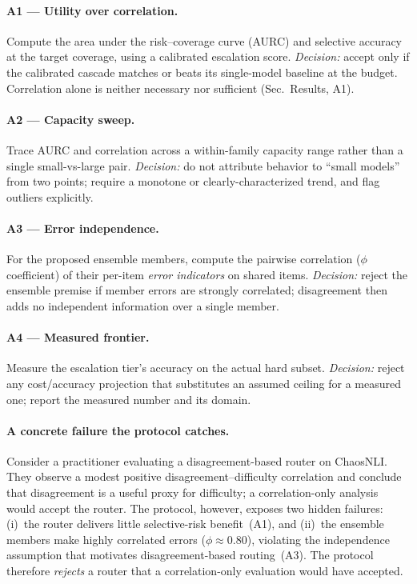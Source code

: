 \documentclass[letterpaper]{article} %
\begin{document}
\paragraph{A1 --- Utility over correlation.}
Compute the area under the risk--coverage curve (AURC) and selective accuracy at
the target coverage, using a calibrated escalation score. \emph{Decision:} accept
only if the calibrated cascade matches or beats its single-model baseline at the
budget. Correlation alone is neither necessary nor sufficient (Sec.~Results, A1).

\paragraph{A2 --- Capacity sweep.}
Trace AURC and correlation across a within-family capacity range rather than a
single small-vs-large pair. \emph{Decision:} do not attribute behavior to ``small
models'' from two points; require a monotone or clearly-characterized trend, and
flag outliers explicitly.

\paragraph{A3 --- Error independence.}
For the proposed ensemble members, compute the pairwise correlation
($\phi$ coefficient) of their per-item \emph{error indicators} on shared items.
\emph{Decision:} reject the ensemble premise if member errors are strongly
correlated; disagreement then adds no independent information over a single member.

\paragraph{A4 --- Measured frontier.}
Measure the escalation tier's accuracy on the actual hard subset. \emph{Decision:}
reject any cost/accuracy projection that substitutes an assumed ceiling for a
measured one; report the measured number and its domain.

\paragraph{A concrete failure the protocol catches.}
Consider a practitioner evaluating a disagreement-based router on ChaosNLI.
They observe a modest positive disagreement--difficulty correlation and conclude
that disagreement is a useful proxy for difficulty; a correlation-only analysis
would accept the router. The protocol, however, exposes two hidden failures:
(i)~the router delivers little selective-risk benefit~(A1), and (ii)~the ensemble
members make highly correlated errors ($\phi \approx 0.80$), violating the
independence assumption that motivates disagreement-based routing~(A3). The
protocol therefore \emph{rejects} a router that a correlation-only evaluation
would have accepted.
\end{document}
